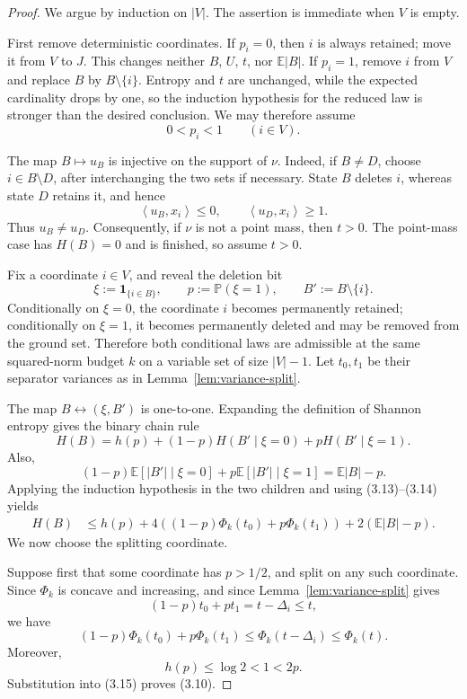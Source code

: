 \documentclass[11pt]{article}
\theoremstyle{definition}
\theoremstyle{remark}
\newcommand{\E}{\mathbb E}
\newcommand{\Pp}{\mathbb P}
\newcommand{\one}{\mathbf 1}
\newcommand{\ip}[2]{\left\langle #1,#2\right\rangle}
\begin{document}
\begin{proof}
We argue by induction on \(|V|\). The assertion is immediate when \(V\) is
empty.

First remove deterministic coordinates. If \(p_i=0\), then \(i\) is always
retained; move it from \(V\) to \(J\). This changes neither \(B\), \(U\),
\(t\), nor \(\E|B|\). If \(p_i=1\), remove \(i\) from \(V\) and replace
\(B\) by \(B\setminus\{i\}\). Entropy and \(t\) are unchanged, while the
expected cardinality drops by one, so the induction hypothesis for the
reduced law is stronger than the desired conclusion. We may therefore
assume
\[
 0<p_i<1\qquad(i\in V).
 \tag{3.12}
\]

The map \(B\mapsto u_B\) is injective on the support of \(\nu\). Indeed, if
\(B\ne D\), choose \(i\in B\setminus D\), after interchanging the two sets
if necessary. State \(B\) deletes \(i\), whereas state \(D\) retains it, and
hence
\[
 \ip{u_B}{x_i}\le0,
 \qquad
 \ip{u_D}{x_i}\ge1.
\]
Thus \(u_B\ne u_D\). Consequently, if \(\nu\) is not a point mass, then
\(t>0\). The point-mass case has \(H(B)=0\) and is finished, so assume
\(t>0\).

Fix a coordinate \(i\in V\), and reveal the deletion bit
\[
 \xi:=\one_{\{i\in B\}},
 \qquad
 p:=\Pp(\xi=1),
 \qquad
 B':=B\setminus\{i\}.
\]
Conditionally on \(\xi=0\), the coordinate \(i\) becomes permanently retained;
conditionally on \(\xi=1\), it becomes permanently deleted and may be removed
from the ground set. Therefore both conditional laws are admissible at the
same squared-norm budget \(k\) on a variable set of size \(|V|-1\). Let \(t_0,t_1\) be
their separator variances as in Lemma~\ref{lem:variance-split}.

The map \(B\leftrightarrow(\xi,B')\) is one-to-one. Expanding the definition of
Shannon entropy gives the binary chain rule
\[
 H(B)
 =
 h(p)
 +(1-p)H(B'\mid \xi=0)
 +pH(B'\mid \xi=1).
 \tag{3.13}
\]
Also,
\[
 (1-p)\E[|B'|\mid \xi=0]
 +p\E[|B'|\mid \xi=1]
 =
 \E|B|-p.
 \tag{3.14}
\]
Applying the induction hypothesis in the two children and using
(3.13)--(3.14) yields
\[
 \begin{aligned}
 H(B)
 &\le
 h(p)
 +4\left(
      (1-p)\Phi_k(t_0)
      +p\Phi_k(t_1)
   \right)
 +2(\E|B|-p).
 \end{aligned}
 \tag{3.15}
\]
We now choose the splitting coordinate.

Suppose first that some coordinate has \(p>1/2\), and split on any such
coordinate. Since \(\Phi_k\) is concave and increasing, and since
Lemma~\ref{lem:variance-split} gives
\[
 (1-p)t_0+pt_1=t-\Delta_i\le t,
\]
we have
\[
 (1-p)\Phi_k(t_0)+p\Phi_k(t_1)
 \le
 \Phi_k(t-\Delta_i)
 \le
 \Phi_k(t).
 \tag{3.16}
\]
Moreover,
\[
 h(p)\le\log2<1<2p.
 \tag{3.17}
\]
Substitution into (3.15) proves (3.10).


\end{proof}
\end{document}
